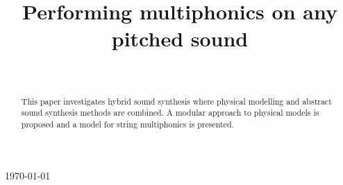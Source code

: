 \documentclass{sigchi}
\def\plaintitle{Performing multiphonics on any pitched sound}
\begin{document}
\title{\plaintitle}

\author{%
  \\
}

\maketitle


\today
\begin{abstract}
This paper investigates hybrid sound synthesis where physical modelling and abstract sound synthesis methods are combined. A modular approach to physical models is proposed and a model for string multiphonics is presented.
\end{abstract}



\end{document}
